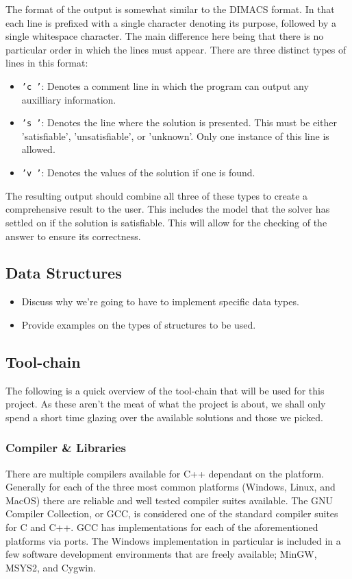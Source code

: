 \documentclass{article}
\begin{document}
The format of the output is somewhat similar to the DIMACS format. In that each line is prefixed
with a single character denoting its purpose, followed by a single whitespace character. The main
difference here being that there is no particular order in which the lines must appear. There are
three distinct types of lines in this format:

\begin{itemize}
    \item \texttt{'c '}: Denotes a comment line in which the program can output any auxilliary
    information.
    \item \texttt{'s '}: Denotes the line where the solution is presented. This must be either
    'satisfiable', 'unsatisfiable', or 'unknown'. Only one instance of this line is allowed.
    \item \texttt{'v '}: Denotes the values of the solution if one is found.
\end{itemize}

The resulting output should combine all three of these types to create a comprehensive result to the
user. This includes the model that the solver has settled on if the solution is satisfiable. This
will allow for the checking of the answer to ensure its correctness.


\subsection{Data Structures}
\begin{itemize}
    \item Discuss why we're going to have to implement specific data types.
    \item Provide examples on the types of structures to be used.
\end{itemize}

\subsection{Tool-chain}
The following is a quick overview of the tool-chain that will be used for this project. As these aren't the meat of what the project is about, we shall only spend a short time glazing over the available solutions and those we picked.

\subsubsection{Compiler \& Libraries}
There are multiple compilers available for C++ dependant on the platform. Generally for each of the three most common platforms (Windows, Linux, and MacOS) there are reliable and well tested compiler suites available. The GNU Compiler Collection, or GCC, is considered one of the standard compiler suites for C and C++. GCC has implementations for each of the aforementioned platforms via ports. The Windows implementation in particular is included in a few software development environments that are freely available; MinGW, MSYS2, and Cygwin.
\end{document}
